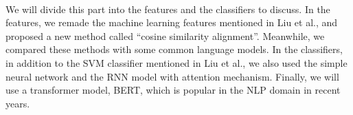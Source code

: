 \documentclass{article}
\begin{document}
\begin{CJK*}{UTF8}{bkai}
\paragraph{}
We will divide this part into the features and the classifiers to discuss. In the features, we remade the machine learning features mentioned in Liu et al., and proposed a new method called ``cosine similarity alignment''. Meanwhile, we compared these methods with some common language models. In the classifiers, in addition to the SVM classifier mentioned in Liu et al., we also used the simple neural network and the RNN model with attention mechanism. Finally, we will use a transformer model, BERT, which is popular in the NLP domain in recent years.




\end{CJK*}
\end{document}
